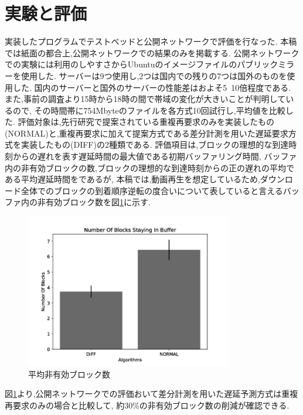 \documentclass{ltjsarticle}
\begin{document}
\section{実験と評価}
\vspace{-2mm}
実装したプログラムでテストベッドと公開ネットワークで評価を行なった.
本稿では紙面の都合上,公開ネットワークでの結果のみを掲載する.
公開ネットワークでの実験には利用のしやすさからUbuntuのイメージファイルのパブリックミラーを使用した.
サーバーは9つ使用し,2つは国内での残りの7つは国外のものを使用した.
国内のサーバーと国外のサーバーの性能差はおよそ5~10倍程度である.
また,事前の調査より15時から18時の間で帯域の変化が大きいことが判明しているので,
その時間帯に754Mbyteのファイルを各方式10回試行し,平均値を比較した.
評価対象は,先行研究で提案されている重複再要求のみを実装したもの(NORMAL)と,重複再要求に加えて提案方式である差分計測を用いた遅延要求方式を実装したもの(DIFF)の2種類である.
評価項目は,ブロックの理想的な到達時刻からの遅れを表す遅延時間の最大値である初期バッファリング時間,
バッファ内の非有効ブロックの数,ブロックの理想的な到達時刻からの正の遅れの平均である平均遅延時間をであるが,
本稿では,動画再生を想定しているため,ダウンロード全体でのブロックの到着順序逆転の度合いについて表していると言えるバッファ内の非有効ブロック数を図\ref{nsbpub}に示す.
\vspace{-4mm}
\begin{figure}[h]
	\centering
	\includegraphics[width=9cm]{figure/nsb-g.pdf}
	\caption{平均非有効ブロック数}
	\label{nsbpub}
\end{figure}
\vspace{-2mm}

図\ref{nsbpub}より,公開ネットワークでの評価おいて差分計測を用いた遅延予測方式は重複再要求のみの場合と比較して,
約30\%の非有効ブロック数の削減が確認できる.
\vspace{-5mm}
\end{document}

